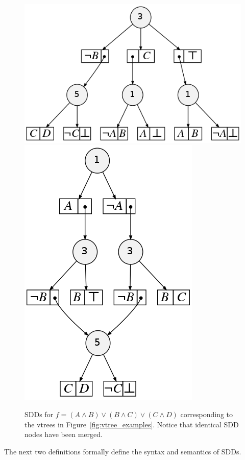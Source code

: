 \documentclass[11pt]{report}
\begin{document}
\begin{figure}
\centering
\includegraphics[scale=0.3]{balancedfirstexample.png}
\includegraphics[scale=0.3]{rightlinearfirstexample.png}

\caption{SDDs for $f = (A \land B) \lor (B \land C) \lor (C \land D)$ corresponding to the vtrees in Figure~\ref{fig:vtree_examples}. Notice that identical SDD nodes have been merged.}
\label{fig:sddexample1} 
\end{figure}

The next two definitions formally define the syntax and semantics of SDDs.
\end{document}
